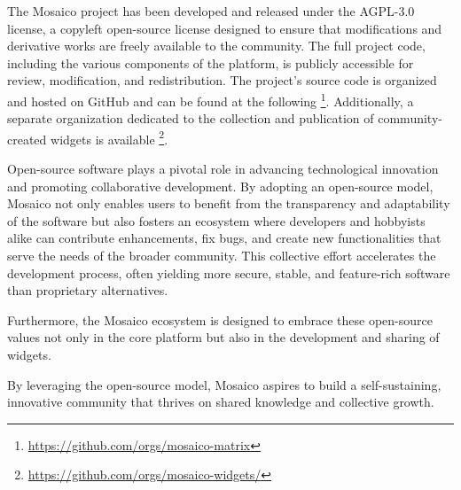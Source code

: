 The Mosaico project has been developed and released under the AGPL-3.0 license, a copyleft open-source license designed to ensure that modifications and derivative works are freely available to the community. The full project code, including the various components of the platform, is publicly accessible for review, modification, and redistribution. The project's source code is organized and hosted on GitHub and can be found at the following \footnote{\url{https://github.com/orgs/mosaico-matrix}}. Additionally, a separate organization dedicated to the collection and publication of community-created widgets is available \footnote{\url{https://github.com/orgs/mosaico-widgets/}}.

Open-source software plays a pivotal role in advancing technological innovation and promoting collaborative development. By adopting an open-source model, Mosaico not only enables users to benefit from the transparency and adaptability of the software but also fosters an ecosystem where developers and hobbyists alike can contribute enhancements, fix bugs, and create new functionalities that serve the needs of the broader community. This collective effort accelerates the development process, often yielding more secure, stable, and feature-rich software than proprietary alternatives.

Furthermore, the Mosaico ecosystem is designed to embrace these open-source values not only in the core platform but also in the development and sharing of widgets. 

By leveraging the open-source model, Mosaico aspires to build a self-sustaining, innovative community that thrives on shared knowledge and collective growth.